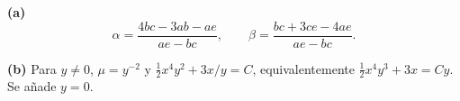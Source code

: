 \noindent\textbf{(a)} \[\alpha=\frac{4bc-3ab-ae}{ae-bc},\qquad \beta=\frac{bc+3ce-4ae}{ae-bc}.\]

\noindent\textbf{(b)} Para $y\ne0$, $\mu=y^{-2}$ y $\frac12x^4y^2+3x/y=C$, equivalentemente $\frac12x^4y^3+3x=Cy$. Se añade $y=0$.
